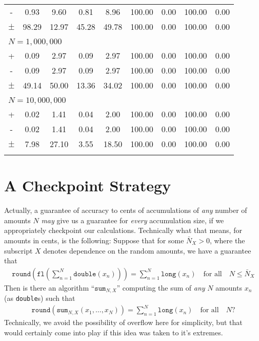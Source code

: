 \documentclass[11pt, oneside]{amsart}   	%
\begin{document}
\begin{table}[ht]
\begin{center}
\begin{tabular}{ c c c c c c c c c }
- & 0.93 & 9.60 & 0.81 & 8.96 & 100.00 & 0.00 & 100.00 & 0.00 \\
$\pm$ & 98.29 & 12.97 & 45.28 & 49.78 & 100.00 & 0.00 & 100.00 & 0.00 \\
\\ \multicolumn{9}{l}{$N = 1,000,000$} \\ \hline
+ & 0.09 & 2.97 & 0.09 & 2.97 & 100.00 & 0.00 & 100.00 & 0.00 \\
- & 0.09 & 2.97 & 0.09 & 2.97 & 100.00 & 0.00 & 100.00 & 0.00 \\
$\pm$ & 49.14 & 50.00 & 13.36 & 34.02 & 100.00 & 0.00 & 100.00 & 0.00 \\
\\ \multicolumn{9}{l}{$N = 10,000,000$} \\ \hline
+ 		& 0.02 & 1.41 	& 0.04 & 2.00 	& 100.00 & 0.00 & 100.00 & 0.00 \\
- 		& 0.02 & 1.41 	& 0.04 & 2.00 	& 100.00 & 0.00 & 100.00 & 0.00 \\
$\pm$ 	& 7.98 & 27.10 & 3.55 & 18.50 & 100.00 & 0.00 & 100.00 & 0.00 \\
\\ \hline
\end{tabular}
\end{center}
\end{table}

\section{A Checkpoint Strategy}

Actually, a guarantee of accuracy to cents of accumulations of {\em any} number of amounts $N$ {\em may} give us a guarantee for {\em every} accumulation size, if we appropriately checkpoint our calculations. Technically what that means, for amounts in cents, is the following: Suppose that for some $\bar{N}_X > 0$, where the subscript $X$ denotes dependence on the random amounts, we have a guarantee that 
\begin{align*}
	\texttt{round}\left( \texttt{fl}\left( \sum_{n=1}^N \texttt{double}(x_n) \right) \right) =  \sum_{n=1}^N \texttt{long}(x_n)
	\quad\text{for all}\quad N \leq \bar{N}_X
\end{align*}
Then is there an algorithm ``$\texttt{sum}_{N,X}$'' computing the sum of {\em any} $N$ amounts $x_n$ (as \texttt{double}s) such that 
\begin{align*}
	\texttt{round}\left( \texttt{sum}_{N,X}\left( x_1,\dotsc,x_N \right) \right) =  \sum_{n=1}^N \texttt{long}(x_n)
	\quad\text{for all}\quad N?
\end{align*}
Technically, we avoid the possibility of overflow here for simplicity, but that would certainly come into play if this idea was taken to it's extremes. 
\end{document}
